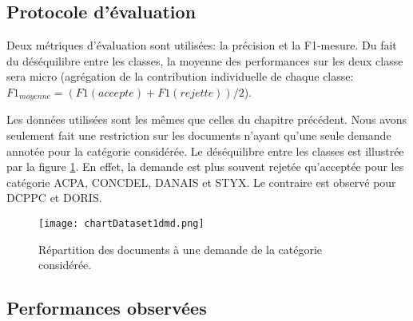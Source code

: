 \subsection{Protocole d'évaluation}
Deux métriques d'évaluation sont utilisées: la précision et la F1-mesure. Du fait du déséquilibre entre les classes, la moyenne des performances sur les deux classe sera micro (agrégation de la contribution individuelle de chaque classe: $F1_{moyenne} = (F1({accepte}) + F1({rejette})) / 2$).

Les données utilisées sont les mêmes que celles du chapitre précédent. Nous avons seulement fait une restriction sur les documents n'ayant qu'une seule demande annotée pour la catégorie considérée. Le déséquilibre entre les classes est illustrée par la figure \ref{fig:sensresultat:stat-1dmd}. En effet, la demande est plus souvent rejetée qu'acceptée pour les catégorie ACPA, CONCDEL, DANAIS et STYX. Le contraire est observé pour DCPPC et DORIS.
\begin{figure}[htb]
\texttt{[image: chartDataset1dmd.png]}
\caption{Répartition des documents à une demande de la catégorie considérée.}\label{fig:sensresultat:stat-1dmd}
\end{figure}

\subsection{Performances observées}

